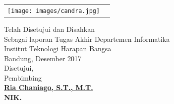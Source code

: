 \begin{center}   
\begin{tabular}{ p{4.5cm}  p{5.5cm}}
 \texttt{[image: images/candra.jpg]} &
\vspace{-4cm}{Disusun oleh:\newline Nama: Candra Ricky Susanto\newline NIM	: 1114046}

\end{tabular}
\end{center}
\doublespacing
{\center
\vspace{1cm}
Telah Disetujui dan Disahkan\\ Sebagai laporan Tugas Akhir Departemen Informatika\\
Institut Teknologi Harapan Bangsa\\[0.5cm]
Bandung,   Desember 2017\\
Disetujui,\\[0.5cm]
Pembimbing\\[2cm]
\bfseries 
{\underline {Ria Chaniago, S.T., M.T.}\\
NIK. \\}}
